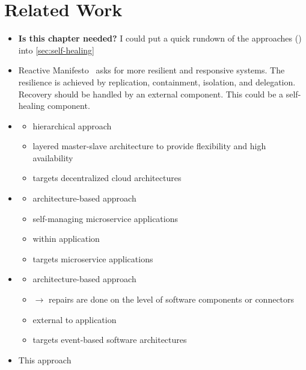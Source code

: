  
\section{Related Work}\label{sec:related-work}
  \begin{itemize}
    \item \textbf{Is this chapter needed?} I could put a quick rundown of the approaches (\cite{ToffettiMicroservices,DashofyArchitecture,gru}) into \cref{sec:self-healing}
    \item Reactive Manifesto~\cite{reactivemanifesto} asks for more resilient and responsive systems.
      The resilience is achieved by replication, containment, isolation, and delegation.
      Recovery should be handled by an external component.
      This could be a self-healing component.
    \item \cite{StackCloud}
      \begin{itemize}
        \item hierarchical approach
        \item layered master-slave architecture to provide flexibility and high availability
        \item targets decentralized cloud architectures
      \end{itemize}
    \item \cite{ToffettiMicroservices}
      \begin{itemize}
        \item architecture-based approach
        \item self-managing microservice applications
        \item within application
        \item targets microservice applications
      \end{itemize}
    \item \cite{DashofyArchitecture}
      \begin{itemize}
        \item architecture-based approach
        \item $\rightarrow$ repairs are done on the level of software components or connectors
        \item external to application
        \item targets event-based software architectures
      \end{itemize}
    \item This approach

\end{itemize}
